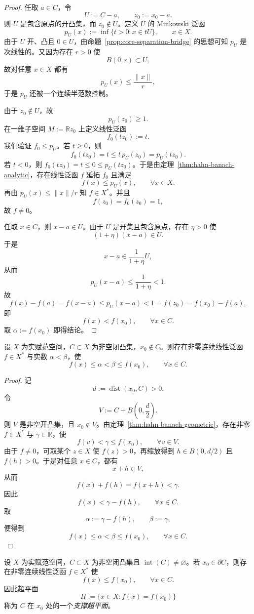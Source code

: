 \begin{proof}
任取 $a\in C$，令
\[
U:=C-a,\qquad z_0:=x_0-a.
\]
则 $U$ 是包含原点的开凸集，而 $z_0\notin U$。定义 $U$ 的 Minkowski 泛函
\[
p_U(x):=\inf\{t>0:x\in tU\},\qquad x\in X.
\]
由于 $U$ 开、凸且 $0\in U$，由命题~\ref{prop:core-separation-bridge} 的思想可知 $p_U$ 是次线性的。又因为存在 $r>0$ 使
\[
B(0,r)\subset U,
\]
故对任意 $x\in X$ 都有
\[
p_U(x)\le \frac{\|x\|}{r},
\]
于是 $p_U$ 还被一个连续半范数控制。

由于 $z_0\notin U$，故
\[
p_U(z_0)\ge 1.
\]
在一维子空间 $M:=\mathbb R z_0$ 上定义线性泛函
\[
f_0(tz_0):=t.
\]
我们验证 $f_0\le p_U$。若 $t\ge 0$，则
\[
f_0(tz_0)=t\le t\,p_U(z_0)=p_U(tz_0).
\]
若 $t<0$，则 $f_0(tz_0)=t\le 0\le p_U(tz_0)$。于是由定理~\ref{thm:hahn-banach-analytic}，存在线性泛函 $f$ 延拓 $f_0$ 且满足
\[
f(x)\le p_U(x),\qquad \forall x\in X.
\]
再由 $p_U(x)\le \|x\|/r$ 知 $f\in X^\ast$。并且
\[
f(z_0)=f_0(z_0)=1,
\]
故 $f\neq 0$。

任取 $x\in C$，则 $x-a\in U$。由于 $U$ 是开集且包含原点，存在 $\eta>0$ 使
\[
(1+\eta)(x-a)\in U.
\]
于是
\[
x-a\in \frac{1}{1+\eta}U,
\]
从而
\[
p_U(x-a)\le \frac{1}{1+\eta}<1.
\]
故
\[
f(x)-f(a)=f(x-a)\le p_U(x-a)<1=f(z_0)=f(x_0)-f(a),
\]
即
\[
f(x)<f(x_0),\qquad \forall x\in C.
\]
取 $\alpha:=f(x_0)$ 即得结论。
\end{proof}

\begin{theorem}[严格分离定理]\label{thm:strict-separation}
设 $X$ 为实赋范空间，$C\subset X$ 为非空闭凸集，$x_0\notin C$。则存在非零连续线性泛函 $f\in X^\ast$ 与实数 $\alpha<\beta$，使
\[
f(x)\le \alpha<\beta\le f(x_0),\qquad \forall x\in C.
\]
\end{theorem}

\begin{proof}
记
\[
d:=\operatorname{dist}(x_0,C)>0.
\]
令
\[
V:=C+B\left(0,\frac d2\right).
\]
则 $V$ 是非空开凸集，且 $x_0\notin V$。由定理~\ref{thm:hahn-banach-geometric}，存在非零 $f\in X^\ast$ 与 $\gamma\in\mathbb R$，使
\[
f(v)<\gamma\le f(x_0),\qquad \forall v\in V.
\]
由于 $f\neq 0$，可取某个 $z\in X$ 使 $f(z)>0$，再缩放得到 $h\in B(0,d/2)$ 且 $f(h)>0$。于是对任意 $x\in C$，都有
\[
x+h\in V,
\]
从而
\[
f(x)+f(h)=f(x+h)<\gamma.
\]
因此
\[
f(x)<\gamma-f(h),\qquad \forall x\in C.
\]
取
\[
\alpha:=\gamma-f(h),\qquad \beta:=\gamma,
\]
便得到
\[
f(x)\le \alpha<\beta\le f(x_0),\qquad \forall x\in C.
\]
\end{proof}

\begin{proposition}[支撑超平面]\label{prop:supporting-hyperplane}
设 $X$ 为实赋范空间，$C\subset X$ 为非空闭凸集且 $\operatorname{int}(C)\neq\varnothing$。若 $x_0\in \partial C$，则存在非零连续线性泛函 $f\in X^\ast$ 使
\[
f(x)\le f(x_0),\qquad \forall x\in C.
\]
因此超平面
\[
H:=\{x\in X:f(x)=f(x_0)\}
\]
称为 $C$ 在 $x_0$ 处的一个\emph{支撑超平面}。
\end{proposition}

